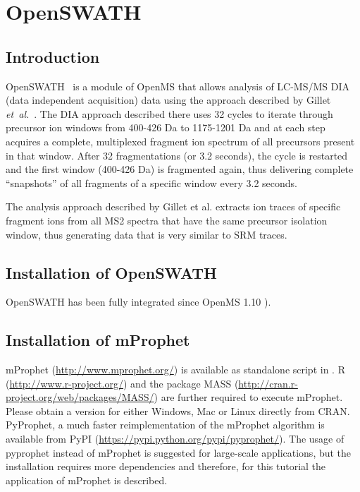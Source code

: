 
\newpage
\section{OpenSWATH}
\subsection{Introduction}

OpenSWATH~\cite{Rost2014fd} is a module of OpenMS that allows analysis of LC-MS/MS DIA (data independent acquisition) data using the approach described by Gillet \textit{et~al.}~\cite{Gillet2012Targeted}. The DIA approach described there uses 32 cycles to iterate through precursor ion windows from 400-426 Da to 1175-1201 Da and at each step acquires a complete, multiplexed fragment ion spectrum of all precursors present in that window. After 32 fragmentations (or 3.2 seconds), the cycle is restarted and the first window (400-426 Da) is fragmented again, thus delivering complete ``snapshots'' of all fragments of a specific window every 3.2 seconds.

The analysis approach described by Gillet et al. extracts ion traces of specific fragment ions from all MS2 spectra that have the same precursor isolation window, thus generating data that is very similar to SRM traces.

\subsection{Installation of OpenSWATH}
OpenSWATH has been fully integrated since OpenMS 1.10 \cite{Kohlbacher2007,Sturm2008,Bertsch2011OpenMS}).

\subsection{Installation of mProphet}
mProphet (\url{http://www.mprophet.org/}) \cite{Reiter2011MProphet} is available as standalone script in . 
R (\url{http://www.r-project.org/}) and the package MASS (\url{http://cran.r-project.org/web/packages/MASS/}) are further required to execute mProphet. 
Please obtain a version for either Windows, Mac or Linux directly from CRAN. \\

\noindent PyProphet, a much faster reimplementation of the mProphet algorithm is available from PyPI (\url{https://pypi.python.org/pypi/pyprophet/}). The usage of pyprophet instead of mProphet is suggested for large-scale applications, but the installation requires more dependencies and therefore, for this tutorial the application of mProphet is described.

